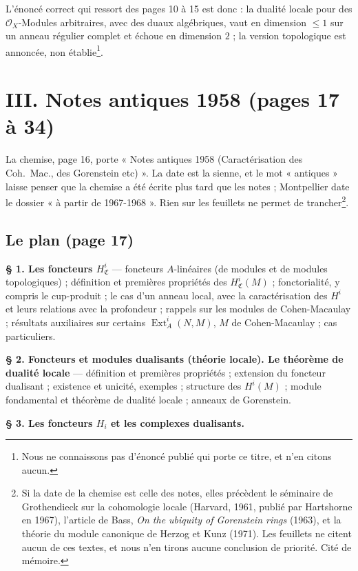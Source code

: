 \documentclass[11pt,a4paper]{article}
\begin{document}
L'énoncé correct qui ressort des pages 10 à 15 est donc : la dualité locale
pour des $\mathcal{O}_X$-Modules arbitraires, avec des duaux algébriques, vaut
en dimension $\leqslant 1$ sur un anneau régulier complet et échoue en
dimension $2$ ; la version topologique est annoncée, non établie\footnote{Nous
ne connaissons pas d'énoncé publié qui porte ce titre, et n'en citons
aucun.}.

\section*{III. Notes antiques 1958 (pages 17 à 34)}

La chemise, page 16, porte « Notes antiques 1958 (Caractérisation des Coh.\
Mac., des Gorenstein etc) ». La date est la sienne, et le mot « antiques »
laisse penser que la chemise a été écrite plus tard que les notes ;
Montpellier date le dossier « à partir de 1967-1968 ». Rien sur les feuillets
ne permet de trancher\footnote{Si la date de la chemise est celle des notes,
elles précèdent le séminaire de Grothendieck sur la cohomologie locale (Harvard,
1961, publié par Hartshorne en 1967), l'article de Bass, \emph{On the
ubiquity of Gorenstein rings} (1963), et la théorie du module canonique de
Herzog et Kunz (1971). Les feuillets ne citent aucun de ces textes, et nous
n'en tirons aucune conclusion de priorité. Cité de mémoire.}.

\subsection*{Le plan (page 17)}

\textbf{§ 1. Les foncteurs $H^i_{\mathfrak{C}}$} --- foncteurs $A$-linéaires
(de modules et de modules topologiques) ; définition et premières propriétés
des $H^i_{\mathfrak{C}}(M)$ ; fonctorialité, y compris le cup-produit ; le cas
d'un anneau local, avec la caractérisation des $H^i$ et leurs relations avec
la profondeur ; rappels sur les modules de Cohen-Macaulay ; résultats
auxiliaires sur certains $\operatorname{Ext}^i_A(N, M)$, $M$ de
Cohen-Macaulay ; cas particuliers.

\textbf{§ 2. Foncteurs et modules dualisants (théorie locale). Le théorème de
dualité locale} --- définition et premières propriétés ; extension du foncteur
dualisant ; existence et unicité, exemples ; structure des $H^i(M)$ ; module
fondamental et théorème de dualité locale ; anneaux de Gorenstein.

\textbf{§ 3. Les foncteurs $H_i$ et les complexes dualisants.}
\end{document}
